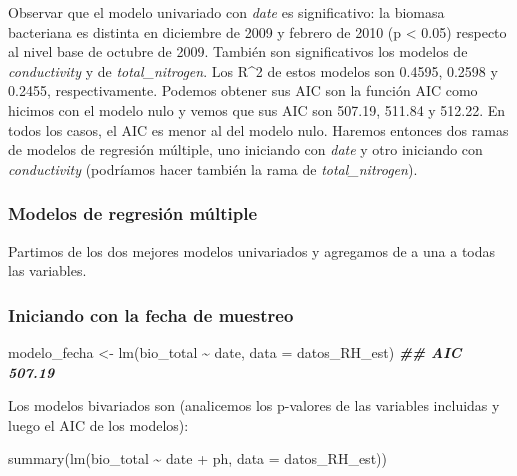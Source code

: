 \documentclass[
]{book}
\newenvironment{Shaded}{\begin{snugshade}}{\end{snugshade}}
\newcommand{\AttributeTok}[1]{\textcolor[rgb]{0.77,0.63,0.00}{#1}}
\newcommand{\DocumentationTok}[1]{\textcolor[rgb]{0.56,0.35,0.01}{\textbf{\textit{#1}}}}
\newcommand{\FunctionTok}[1]{\textcolor[rgb]{0.00,0.00,0.00}{#1}}
\newcommand{\NormalTok}[1]{#1}
\newcommand{\OtherTok}[1]{\textcolor[rgb]{0.56,0.35,0.01}{#1}}
\newcommand{\SpecialCharTok}[1]{\textcolor[rgb]{0.00,0.00,0.00}{#1}}
\begin{document}
Observar que el modelo univariado con \emph{date} es significativo: la biomasa bacteriana es distinta en diciembre de 2009 y febrero de 2010 (p \textless{} 0.05) respecto al nivel base de octubre de 2009. También son significativos los modelos de \emph{conductivity} y de \emph{total\_nitrogen}. Los R\^{}2 de estos modelos son 0.4595, 0.2598 y 0.2455, respectivamente. Podemos obtener sus AIC son la función AIC como hicimos con el modelo nulo y vemos que sus AIC son 507.19, 511.84 y 512.22. En todos los casos, el AIC es menor al del modelo nulo. Haremos entonces dos ramas de modelos de regresión múltiple, uno iniciando con \emph{date} y otro iniciando con \emph{conductivity} (podríamos hacer también la rama de \emph{total\_nitrogen}).

\hypertarget{modelos-de-regresiuxf3n-muxfaltiple}{%
\subsubsection{Modelos de regresión múltiple}\label{modelos-de-regresiuxf3n-muxfaltiple}}

Partimos de los dos mejores modelos univariados y agregamos de a una a todas las variables.

\hypertarget{iniciando-con-la-fecha-de-muestreo}{%
\subsubsection{Iniciando con la fecha de muestreo}\label{iniciando-con-la-fecha-de-muestreo}}

\begin{Shaded}
\begin{Highlighting}[]
\NormalTok{modelo\_fecha }\OtherTok{\textless{}{-}} \FunctionTok{lm}\NormalTok{(bio\_total }\SpecialCharTok{\textasciitilde{}}\NormalTok{ date, }\AttributeTok{data =}\NormalTok{ datos\_RH\_est) }\DocumentationTok{\#\# AIC 507.19}
\end{Highlighting}
\end{Shaded}

Los modelos bivariados son (analicemos los p-valores de las variables incluidas y luego el AIC de los modelos):

\begin{Shaded}
\begin{Highlighting}[]
\FunctionTok{summary}\NormalTok{(}\FunctionTok{lm}\NormalTok{(bio\_total }\SpecialCharTok{\textasciitilde{}}\NormalTok{ date }\SpecialCharTok{+}\NormalTok{ ph, }\AttributeTok{data =}\NormalTok{ datos\_RH\_est))}
\end{Highlighting}
\end{Shaded}
\end{document}
